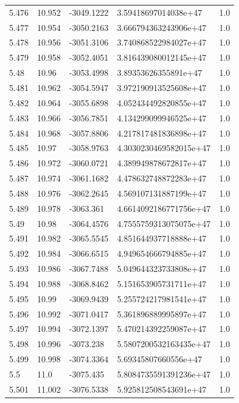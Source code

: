 \begin{tabular}{lllll}
5.476 & 10.952 & -3049.1222 & 3.59418697014038e+47 & 1.0 \\
5.477 & 10.954 & -3050.2163 & 3.666794363243906e+47 & 1.0 \\
5.478 & 10.956 & -3051.3106 & 3.740868522984027e+47 & 1.0 \\
5.479 & 10.958 & -3052.4051 & 3.816439080012145e+47 & 1.0 \\
5.48 & 10.96 & -3053.4998 & 3.89353626355891e+47 & 1.0 \\
5.481 & 10.962 & -3054.5947 & 3.972190913525608e+47 & 1.0 \\
5.482 & 10.964 & -3055.6898 & 4.052434492820855e+47 & 1.0 \\
5.483 & 10.966 & -3056.7851 & 4.134299099946525e+47 & 1.0 \\
5.484 & 10.968 & -3057.8806 & 4.217817481836898e+47 & 1.0 \\
5.485 & 10.97 & -3058.9763 & 4.3030230469582015e+47 & 1.0 \\
5.486 & 10.972 & -3060.0721 & 4.389949878672817e+47 & 1.0 \\
5.487 & 10.974 & -3061.1682 & 4.478632748872283e+47 & 1.0 \\
5.488 & 10.976 & -3062.2645 & 4.569107131887199e+47 & 1.0 \\
5.489 & 10.978 & -3063.361 & 4.6614092186771756e+47 & 1.0 \\
5.49 & 10.98 & -3064.4576 & 4.7555759313075075e+47 & 1.0 \\
5.491 & 10.982 & -3065.5545 & 4.851644937718888e+47 & 1.0 \\
5.492 & 10.984 & -3066.6515 & 4.949654666794885e+47 & 1.0 \\
5.493 & 10.986 & -3067.7488 & 5.049644323733808e+47 & 1.0 \\
5.494 & 10.988 & -3068.8462 & 5.151653905731711e+47 & 1.0 \\
5.495 & 10.99 & -3069.9439 & 5.255724217981541e+47 & 1.0 \\
5.496 & 10.992 & -3071.0417 & 5.361896889995897e+47 & 1.0 \\
5.497 & 10.994 & -3072.1397 & 5.470214392259087e+47 & 1.0 \\
5.498 & 10.996 & -3073.238 & 5.5807200532163435e+47 & 1.0 \\
5.499 & 10.998 & -3074.3364 & 5.69345807660556e+47 & 1.0 \\
5.5 & 11.0 & -3075.435 & 5.8084735591391236e+47 & 1.0 \\
5.501 & 11.002 & -3076.5338 & 5.925812508543691e+47 & 1.0 \\

\end{tabular}
